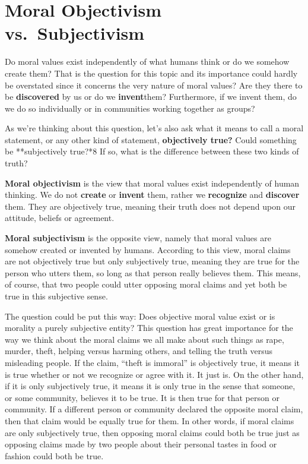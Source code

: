 \documentclass[
]{book}
\begin{document}
\hypertarget{moral-objectivism-vs.-subjectivism}{%
\section{Moral Objectivism vs.~Subjectivism}\label{moral-objectivism-vs.-subjectivism}}

Do moral values exist independently of what humans think or do we somehow create them? That is the question for this topic and its importance could hardly be overstated since it concerns the very nature of moral values? Are they there to be \textbf{discovered} by us or do we \textbf{invent}them? Furthermore, if we invent them, do we do so individually or in communities working together as groups?

As we're thinking about this question, let's also ask what it means to call a moral statement, or any other kind of statement, \textbf{objectively true?} Could something be **subjectively true?*8 If so, what is the difference between these two kinds of truth?

\textbf{Moral objectivism} is the view that moral values exist independently of human thinking. We do not \textbf{create} or \textbf{invent} them, rather we \textbf{recognize} and \textbf{discover} them. They are objectively true, meaning their truth does not depend upon our attitude, beliefs or agreement.

\textbf{Moral subjectivism} is the opposite view, namely that moral values are somehow created or invented by humans. According to this view, moral claims are not objectively true but only subjectively true, meaning they are true for the person who utters them, so long as that person really believes them. This means, of course, that two people could utter opposing moral claims and yet both be true in this subjective sense.

The question could be put this way: Does objective moral value exist or is morality a purely subjective entity? This question has great importance for the way we think about the moral claims we all make about such things as rape, murder, theft, helping versus harming others, and telling the truth versus misleading people. If the claim, ``theft is immoral'' is objectively true, it means it is true whether or not we recognize or agree with it. It just is. On the other hand, if it is only subjectively true, it means it is only true in the sense that someone, or some community, believes it to be true. It is then true for that person or community. If a different person or community declared the opposite moral claim, then that claim would be equally true for them. In other words, if moral claims are only subjectively true, then opposing moral claims could both be true just as opposing claims made by two people about their personal tastes in food or fashion could both be true.
\end{document}
